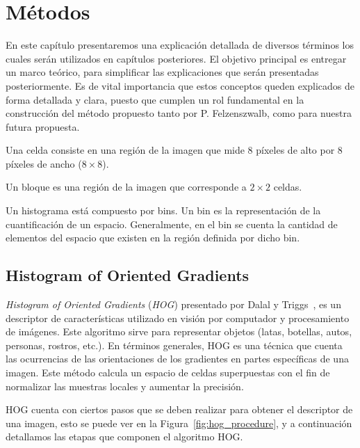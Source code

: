 \chapter[Métodos ]{Métodos }\label{ch:capitulo3}

En este capítulo presentaremos una explicación detallada de diversos términos los cuales serán utilizados en capítulos posteriores. El objetivo principal es entregar un marco teórico, para simplificar las explicaciones que serán presentadas posteriormente. Es de vital importancia que estos conceptos queden explicados de forma detallada y clara, puesto que cumplen un rol fundamental en la construcción del método propuesto tanto por P. Felzenszwalb, como para nuestra futura propuesta.

\begin{definition}[Celdas]
\label{def:cel}
Una celda consiste en una región de la imagen que mide $8$ píxeles de alto por $8$ píxeles de ancho ($8 \times 8$).
\end{definition}

\begin{definition}[Bloques]
\label{def:blo}
Un bloque es una región de la imagen que corresponde a $2 \times 2$ celdas.
\end{definition}

\begin{definition}[Bins]
\label{def:bin}
Un histograma está compuesto por bins. Un bin es la representación de la cuantificación de un espacio. Generalmente, en el bin se cuenta la cantidad de elementos del espacio que existen en la región definida por dicho bin.
\end{definition}

\section{Histogram of Oriented Gradients}\label{subsec:hog}
\textit{Histogram of Oriented Gradients} (\textit{HOG}) presentado por Dalal y Triggs~\cite{hog2005}, es un descriptor de características utilizado en visión por computador y procesamiento de imágenes. Este algoritmo sirve para representar objetos (latas, botellas, autos, personas, rostros, etc.). En términos generales, HOG es una técnica que cuenta las ocurrencias de las orientaciones de los gradientes en partes específicas de una imagen. Este método calcula un espacio de celdas superpuestas con el fin de normalizar las muestras locales y aumentar la precisión.

HOG cuenta con ciertos pasos que se deben realizar para obtener el descriptor de una imagen, esto se puede ver en la Figura~\ref{fig:hog_procedure}, y a continuación detallamos las etapas que componen el algoritmo HOG.

